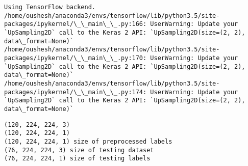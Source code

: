 \documentclass[11pt]{article}
\begin{document}
    \begin{Verbatim}[commandchars=\\\{\}]
Using TensorFlow backend.
/home/oushesh/anaconda3/envs/tensorflow/lib/python3.5/site-packages/ipykernel/\_\_main\_\_.py:166: UserWarning: Update your `UpSampling2D` call to the Keras 2 API: `UpSampling2D(size=(2, 2), data\_format=None)`
/home/oushesh/anaconda3/envs/tensorflow/lib/python3.5/site-packages/ipykernel/\_\_main\_\_.py:170: UserWarning: Update your `UpSampling2D` call to the Keras 2 API: `UpSampling2D(size=(2, 2), data\_format=None)`
/home/oushesh/anaconda3/envs/tensorflow/lib/python3.5/site-packages/ipykernel/\_\_main\_\_.py:174: UserWarning: Update your `UpSampling2D` call to the Keras 2 API: `UpSampling2D(size=(2, 2), data\_format=None)`

    \end{Verbatim}

    \begin{Verbatim}[commandchars=\\\{\}]
(120, 224, 224, 3)
(120, 224, 224, 1)
(120, 224, 224, 1) size of preprocessed labels
(76, 224, 224, 3) size of testing dataset
(76, 224, 224, 1) size of testing labels

    \end{Verbatim}
\end{document}
